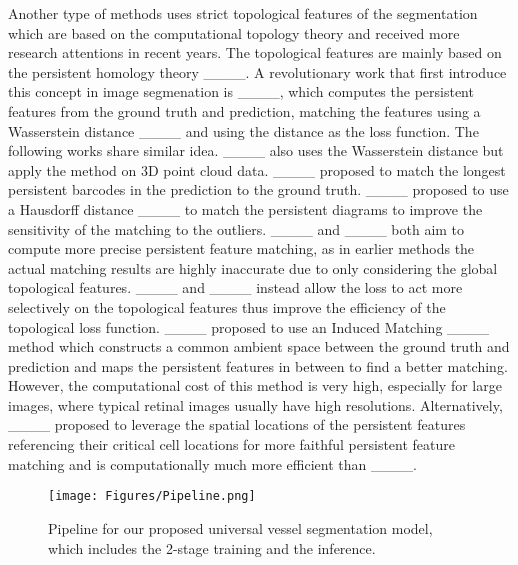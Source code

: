 Another type of methods uses strict topological features of the segmentation which are based on the computational topology theory and received more research attentions in recent years. The topological features are mainly based on the persistent homology theory ____. A revolutionary work that first introduce this concept in image segmenation is ____, which computes the persistent features from the ground truth and prediction, matching the features using a Wasserstein distance ____ and using the distance as the loss function. The following works share similar idea. ____ also uses the Wasserstein distance but apply the method on 3D point cloud data. ____ proposed to match the longest persistent barcodes in the prediction to the ground truth. ____ proposed to use a Hausdorff distance ____ to match the persistent diagrams to improve the sensitivity of the matching to the outliers. ____ and ____ both aim to compute more precise persistent feature matching, as in earlier methods the actual matching results are highly inaccurate due to only considering the global topological features. ____ and ____ instead allow the loss to act more selectively on the topological features thus improve the efficiency of the topological loss function. ____ proposed to use an Induced Matching ____ method which constructs a common ambient space between the ground truth and prediction and maps the persistent features in between to find a better matching. However, the computational cost of this method is very high, especially for large images, where typical retinal images usually have high resolutions. Alternatively, ____ proposed to leverage the spatial locations of the persistent features referencing their critical cell locations for more faithful persistent feature matching and is computationally much more efficient than ____.

\begin{figure*}[ht]
\centering
\texttt{[image: Figures/Pipeline.png]}
\vspace{-0.7cm}
\caption{Pipeline for our proposed universal vessel segmentation model, which includes the 2-stage training and the inference.}
\label{fig:pipeline}
\vspace{-0.6cm}
\end{figure*}